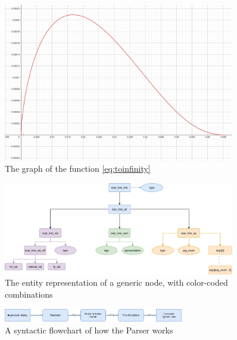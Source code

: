 \documentclass{article}
\theoremstyle{plain}
\theoremstyle{definition}
\begin{document}
	\newpage
	\printbibliography
	
	\newpage
	\appendix
	\begin{figure}
		\centering
		\includegraphics[width=0.9\textwidth]{img/limoff1.PNG}
		\caption{The graph of the function \eqref{eq:toinfinity}}\label{fig:limoff1}
	\end{figure}

	\begin{figure}
		\centering
		\includegraphics[width=0.9\textwidth]{chart/expr_structs.PNG}
		\caption{The entity representation of a generic node, with color-coded combinations} \label{fig:expr_structs}
	\end{figure}

	\begin{figure}
		\centering
		\includegraphics[width=0.7\textwidth]{chart/parser.PNG}
		\caption{A syntactic flowchart of how the Parser works} \label{fig:parser}
	\end{figure}
\end{document}
